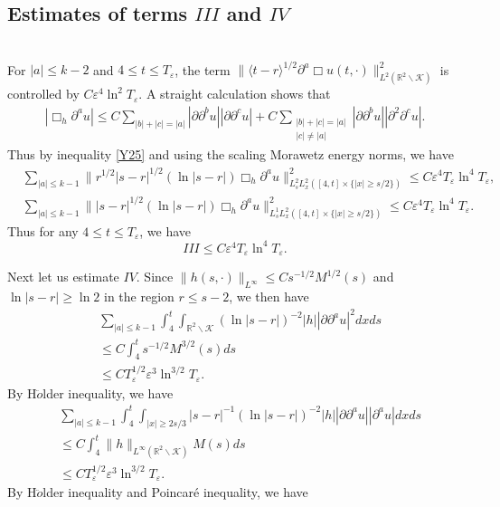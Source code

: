\documentclass[11pt, reqno]{amsart}
\theoremstyle{definition}
\theoremstyle{remark}
\theoremstyle{definition}
\numberwithin{equation}{section}
\numberwithin{equation}{section}
\def\leq{\leqslant}
\def\geq{\geqslant}
\begin{document}
\subsection{Estimates of terms $III$ and $IV$}
~\\
For $|a|\leq k-2$ and $4\leq t\leq T_{\varepsilon}$, the term
$\|\langle t-r\rangle^{1/2}\partial^a\Box
u(t,\cdot)\|^2_{L^2(\mathbb R^2\backslash\mathcal {K})}$ is
controlled by $C\varepsilon^4\ln^2T_{\varepsilon}$. A straight
calculation shows that
\begin{align*}
|\Box_h\partial^au|\leq
C\sum_{|b|+|c|=|a|}|\partial\partial^bu||\partial\partial^cu|+C\sum_{\substack{|b|+|c|=|a|\\|c|\neq
|a|}}|\partial\partial^bu||\partial^2\partial^cu|.
\end{align*}
Thus by inequality \eqref{Y25} and using the scaling Morawetz energy norms, we
have
\begin{align*}
&\sum_{|a|\leq
k-1}\|r^{1/2}|s-r|^{1/2}(\ln|s-r|)\Box_h\partial^au\|^2_{L^2_sL^2_x([4,t]\times\{|x|\geq
s/2\})}\leq C\varepsilon^4T_{\varepsilon}\ln^4T_{\varepsilon},
\\&\sum_{|a|\leq
k-1}\||s-r|^{1/2}(\ln|s-r|)\Box_h\partial^au\|^2_{L_s^1L_x^2([4,t]\times\{|x|\geq
s/2\})}\leq C\varepsilon^4T_{\varepsilon}\ln^4T_{\varepsilon}.
\end{align*}
Thus for any $4\leq t\leq T_{\varepsilon}$, we have 
\[III\leq
C\varepsilon^4T_{\varepsilon}\ln^4T_{\varepsilon}.
\]
\par Next let us estimate $IV$.
Since $\|h(s,\cdot)\|_{L^{\infty}}\leq Cs^{-1/2}M^{1/2}(s)$ and
$\ln|s-r|\geq\ln2$ in the region $r\leq s-2$, we then have
\begin{align*}
&\sum_{|a|\leq k-1}\int_4^t\int_{\mathbb R^2\backslash\mathcal
{K}}(\ln|s-r|)^{-2}|h||\partial\partial^au|^2dxds
\\&\leq C\int_4^ts^{-1/2}M^{3/2}(s)ds
\\&\leq CT_{\varepsilon}^{1/2}\varepsilon^3\ln^{3/2}T_{\varepsilon}.
\end{align*}
By H$\ddot{o}$lder inequality, we have
\begin{align*}
&\sum_{|a|\leq
k-1}\int_4^t\int_{|x|\geq2s/3}|s-r|^{-1}(\ln|s-r|)^{-2}|h||\partial\partial^a
u||\partial^au|dxds
\\&\leq C\int_4^t\|h\|_{L^{\infty}(\mathbb
R^2\backslash\mathcal
{K})}M(s)ds
\\&\leq CT_{\varepsilon}^{1/2}\varepsilon^3\ln^{3/2}T_{\varepsilon}.
\end{align*}
By H$\ddot{o}$lder inequality and Poincar\'{e} inequality, we have
\end{document}
